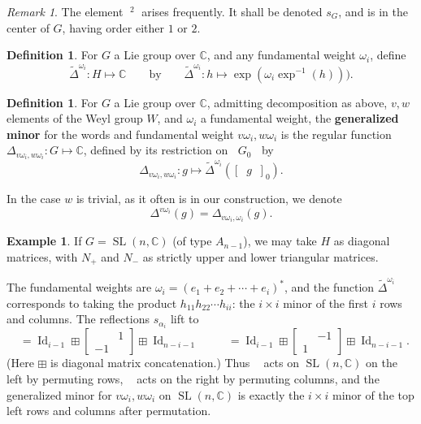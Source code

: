 \documentclass{amsart}
\theoremstyle{plain}
\theoremstyle{definition}
\newtheorem{definition}[theorem]{Definition}
\newtheorem{example}[theorem]{Example}
\theoremstyle{remark}
\newtheorem{remark}[theorem]{Remark}
\newcommand{\defined}[1]{\textbf{#1}}
\newcommand{\fundamentalweight}{\omega}
\newcommand{\genminor}[2]{\Delta^{{#1} \fundamentalweight_{#2}}}
\newcommand{\genminoryz}[3]{\Delta_{{#1} \fundamentalweight_{#3}, {#2}%
    \fundamentalweight_{#3}}}
\newcommand{\lifttoG}[1]{{\mathop{\overline{#1}}}}
\newcommand{\dlifttoG}[1]{{\mathop{\overline{\overline{#1}}}}}
\newcommand{\pregenminor}[1]{\widetilde{\Delta}^{#1}}
\DeclareMathOperator{\Id}{Id}
\DeclareMathOperator{\SL}{SL}
\begin{document}
  \begin{remark}
    \label{rem:sG}
    The element $\lifttoG{w_0}^2$ arises frequently. It shall be denoted
    $s_G$, and is in the center of $G$, having order either $1$ or $2$.
  \end{remark}

  \begin{definition}
    \label{def:pre-generalized-minor}
    For $G$ a Lie group over $\mathbb{C}$, and any fundamental weight
    $\fundamentalweight_i$, define \[ \pregenminor{\fundamentalweight_i}
      : H \mapsto \mathbb{C} \qquad \text{by} \qquad
      \pregenminor{\fundamentalweight_i} : h \mapsto
      \exp(\fundamentalweight_i\exp^{-1}(h))). \]
  \end{definition}

  \begin{definition}
    \label{def:generalized-minor}
    For $G$ a Lie group over $\mathbb{C}$, admitting decomposition as
    above, $v, w$ elements of the Weyl group $W$, and
    $\fundamentalweight_i$ a fundamental weight, the
    \defined{generalized minor} for the words and fundamental weight $v
    \fundamentalweight_i, w \fundamentalweight_i$ is the regular
    function $\genminoryz{v}{w}{i} : G \mapsto \mathbb{C}$, defined by
    its restriction on $\dlifttoG{v} G_0 \lifttoG{w^{-1}}$ by \[
      \genminoryz{v}{w}{i} : g \mapsto
      \pregenminor{\fundamentalweight_i} \left( \left[\dlifttoG{v^{-1}}g
      \lifttoG{w}\right]_{0} \right). \]

    In the case $w$ is trivial, as it often is in our construction, we
    denote \[ \genminor{v}{i}(g) = \genminoryz{v}{}{i}(g). \]
  \end{definition}

  \begin{example}
    If $G = \SL(n,\mathbb{C})$ (of type $A_{n-1}$), we may take $H$ as
    diagonal matrices, with $N_{+}$ and $N_{-}$ as strictly upper and
    lower triangular matrices.

    The fundamental weights are $\fundamentalweight_i = (e_1 + e_2 +
    \dotsb + e_i)^{\ast}$, and the function
    $\pregenminor{\fundamentalweight_i}$ corresponds to taking the
    product $h_{11} h_{22} \dotsb h_{ii}$: the $i \times i$ minor of the
    first $i$ rows and columns. The reflections $s_{\alpha_i}$ lift to
    \[ \dlifttoG{s_i} = \Id_{i-1} \boxplus \begin{bmatrix} & 1 \\ -1 &
      \end{bmatrix} \boxplus \Id_{n-i-1} \qquad \lifttoG{s_i} =
      \Id_{i-1} \boxplus \begin{bmatrix} & -1 \\ 1 & \end{bmatrix}
      \boxplus \Id_{n-i-1}. \] (Here $\boxplus$ is diagonal matrix
    concatenation.) Thus $\dlifttoG{s_i}$ acts on $\SL(n, \mathbb{C})$
    on the left by permuting rows, $\lifttoG{s_i}$ acts on the right by
    permuting columns, and the generalized minor for $v
    \fundamentalweight_i,w\fundamentalweight_i$ on $\SL(n, \mathbb{C})$
    is exactly the $i \times i$ minor of the top left rows and columns
    after permutation.
  \end{example}
\end{document}
